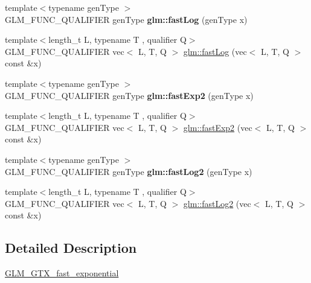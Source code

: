 \begin{DoxyCompactItemize}
{\footnotesize template$<$typename gen\+Type $>$ }\\G\+L\+M\+\_\+\+F\+U\+N\+C\+\_\+\+Q\+U\+A\+L\+I\+F\+I\+ER gen\+Type {\bfseries glm\+::fast\+Log} (gen\+Type x)
\item 
{\footnotesize template$<$length\+\_\+t L, typename T , qualifier Q$>$ }\\G\+L\+M\+\_\+\+F\+U\+N\+C\+\_\+\+Q\+U\+A\+L\+I\+F\+I\+ER vec$<$ L, T, Q $>$ \hyperlink{group__gtx__fast__exponential_ga937256993a7219e73f186bb348fe6be8}{glm\+::fast\+Log} (vec$<$ L, T, Q $>$ const \&x)
\item 
\mbox{\label{fast__exponential_8inl_a2a49ccff3646c4c60938e09a06f49e50}} 
{\footnotesize template$<$typename gen\+Type $>$ }\\G\+L\+M\+\_\+\+F\+U\+N\+C\+\_\+\+Q\+U\+A\+L\+I\+F\+I\+ER gen\+Type {\bfseries glm\+::fast\+Exp2} (gen\+Type x)
\item 
{\footnotesize template$<$length\+\_\+t L, typename T , qualifier Q$>$ }\\G\+L\+M\+\_\+\+F\+U\+N\+C\+\_\+\+Q\+U\+A\+L\+I\+F\+I\+ER vec$<$ L, T, Q $>$ \hyperlink{group__gtx__fast__exponential_gacaaed8b67d20d244b7de217e7816c1b6}{glm\+::fast\+Exp2} (vec$<$ L, T, Q $>$ const \&x)
\item 
\mbox{\label{fast__exponential_8inl_ae4f91aa04733368c8e55da6e592005d8}} 
{\footnotesize template$<$typename gen\+Type $>$ }\\G\+L\+M\+\_\+\+F\+U\+N\+C\+\_\+\+Q\+U\+A\+L\+I\+F\+I\+ER gen\+Type {\bfseries glm\+::fast\+Log2} (gen\+Type x)
\item 
{\footnotesize template$<$length\+\_\+t L, typename T , qualifier Q$>$ }\\G\+L\+M\+\_\+\+F\+U\+N\+C\+\_\+\+Q\+U\+A\+L\+I\+F\+I\+ER vec$<$ L, T, Q $>$ \hyperlink{group__gtx__fast__exponential_ga7562043539194ccc24649f8475bc5584}{glm\+::fast\+Log2} (vec$<$ L, T, Q $>$ const \&x)
\end{DoxyCompactItemize}


\subsection{Detailed Description}
\hyperlink{group__gtx__fast__exponential}{G\+L\+M\+\_\+\+G\+T\+X\+\_\+fast\+\_\+exponential} 